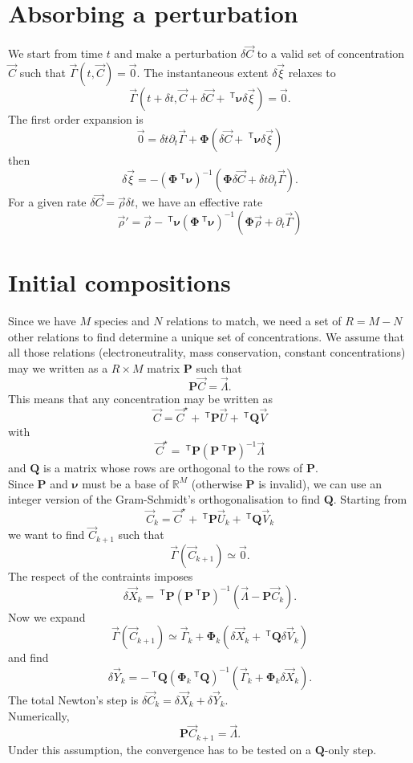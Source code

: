 \documentclass[aps]{revtex4}
\newcommand{\mymat}[1]{\bm{#1}}
\newcommand{\mytrn}[1]{~^{\mathsf{T}}{#1}}
\begin{document}
\section{Absorbing a perturbation}
We start from time $t$ and make a perturbation $\delta\vec{C}$ to a valid set of concentration $\vec{C}$ such that 
$\vec{\Gamma}(t,\vec{C})=\vec{0}$.
The instantaneous extent $\delta\vec{\xi}$ relaxes to 
$$
\vec{\Gamma}(t+\delta t,\vec{C}+\delta\vec{C}+\mytrn{\mymat{\nu}}\delta\vec{\xi}) = \vec{0}.
$$
The first order expansion
is
$$
	\vec{0} = \delta t \partial_t \vec{\Gamma} + \mymat{\Phi}\left( \delta\vec{C} + \mytrn{\mymat{\nu}}\delta\vec{\xi} \right)
$$
then
$$
	\delta\vec{\xi} = -\left(\mymat{\Phi}\mytrn{\mymat{\nu}}\right)^{-1}\left(\mymat{\Phi}\delta\vec{C}+\delta t \partial_t\vec{\Gamma}\right).
$$
For a given rate $\delta\vec{C} = \vec{\rho} \delta t$, we have an effective rate
$$
	\vec{\rho}' = \vec{\rho} -  \mytrn{\mymat{\nu}}\left(\mymat{\Phi}\mytrn{\mymat{\nu}}\right)^{-1}\left(\mymat{\Phi}\vec{\rho}+\partial_t\vec{\Gamma}\right)
$$

\section{Initial compositions}
Since we have $M$ species and $N$ relations to match, we need
a set of $R=M-N$ other relations to find determine a unique set of concentrations.
We assume that all those relations (electroneutrality, mass conservation, constant concentrations)
may we written as a $R\times M$ matrix $\mymat{P}$ such that
$$
	\mymat{P}\vec{C} = \vec{\Lambda}.
$$
This means that any concentration may be written as
$$
	\vec{C} = \vec{C}^\star + \mytrn{\mymat{P}} \vec{U} + \mytrn{\mymat{Q}} \vec{V}
$$
with
$$
	\vec{C}^\star = \mytrn{\mymat{P}} \left(\mymat{P}\mytrn{\mymat{P}}\right)^{-1}\vec{\Lambda}
$$
and $\mymat{Q}$ is a matrix whose rows are orthogonal to the rows of $\mymat{P}$.\\
Since $\mymat{P}$ and $\mymat{\nu}$ must be a base of $\mathbb{R}^{M}$ (otherwise $\mymat{P}$ is invalid), we can 
use an integer version of the Gram-Schmidt's orthogonalisation to find $\mymat{Q}$.
Starting from 
$$
	\vec{C}_k = \vec{C}^\star + \mytrn{\mymat{P}} \vec{U}_k + \mytrn{\mymat{Q}} \vec{V}_k
$$
we want to find $\vec{C}_{k+1}$ such that
$$
	\vec{\Gamma}(\vec{C}_{k+1}) \simeq \vec{0}.
$$
The respect of the contraints imposes
$$
	\delta\vec{X}_k = \mytrn{\mymat{P}} 
	\left(\mymat{P}\mytrn{\mymat{P}}\right)^{-1} \left(\vec{\Lambda} - \mymat{P}\vec{C}_k\right).
$$
Now we expand
$$
	\vec{\Gamma}\left(\vec{C}_{k+1}\right) \simeq \vec{\Gamma}_k + \mymat{\Phi}_k\left(\delta\vec{X}_k+\mytrn{\mymat{Q}} \delta\vec{V}_k\right)
$$
and find
$$
	\delta\vec{Y}_k = -\mytrn{\mymat{Q}} \left(\mymat{\Phi}_k\mytrn{\mymat{Q}}\right)^{-1} \left(\vec{\Gamma}_k+\mymat{\Phi}_k \delta\vec{X}_k\right).
$$
The total Newton's step is $\delta\vec{C}_k=\delta\vec{X}_k+\delta\vec{Y}_k$.\\
Numerically,
$$
	\mymat{P}\vec{C}_{k+1} = \vec{\Lambda}.
$$
Under this assumption, the convergence has to be tested on a $\mymat{Q}$-only step.
\end{document}
